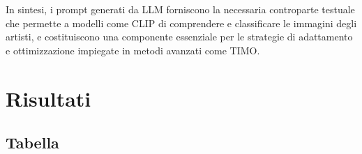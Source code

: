 \documentclass[11pt,a4paper]{article}
\begin{document}
In sintesi, i prompt generati da LLM forniscono la necessaria controparte testuale che permette a modelli come CLIP di comprendere e classificare le immagini degli artisti, e costituiscono una componente essenziale per le strategie di adattamento e ottimizzazione impiegate in metodi avanzati come TIMO.




\section{Risultati}
\subsection{Tabella}
\begin{table}[H] %
    \centering
    \caption{Risultati Medi di Accuratezza (\%) su ArtGraph. Ogni valore rappresenta la media delle accuratezze ottenute su 10 diversi seed per la specifica combinazione di Backbone, Numero di Shots e Modello di Adattamento.}   
\end{table}
\end{document}
